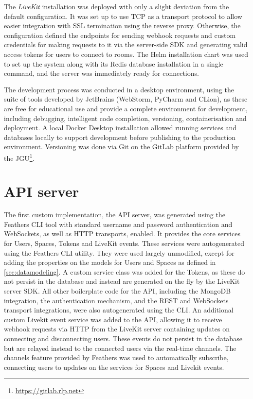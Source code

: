 The \emph{LiveKit} installation was deployed with only a slight deviation from the default configuration.
It was set up to use \ac{TCP} as a transport protocol to allow easier integration with \ac{SSL} termination using the reverse proxy.
Otherwise, the configuration defined the endpoints for sending webhook requests and custom credentials for making requests to it via the server-side \ac{SDK} and generating valid access tokens for users to connect to rooms.
The Helm installation chart was used to set up the system along with its Redis database installation in a single command, and the server was immediately ready for connections.

The development process was conducted in a desktop environment, using the suite of tools developed by JetBrains (WebStorm, PyCharm and CLion), as these are free for educational use and provide a complete environment for development, including debugging, intelligent code completion, versioning, containerisation and deployment.
A local Docker Desktop installation allowed running services and databases locally to support development before publishing to the production environment.
Versioning was done via Git on the GitLab platform provided by the \ac{JGU}\footnote{\url{https://gitlab.rlp.net}}.

\section{API server}
\label{sec:api-server}

The first custom implementation, the \ac{API} server, was generated using the Feathers \ac{CLI} tool with standard username and password authentication and WebSockets, as well as \ac{HTTP} transports, enabled.
It provides the core services for Users, Spaces, Tokens and LiveKit events.
These services were autogenerated using the Feathers \ac{CLI} utility.
They were used largely unmodified, except for adding the properties on the models for Users and Spaces as defined in \autoref{sec:datamodeling}.
A custom service class was added for the Tokens, as these do not persist in the database and instead are generated on the fly by the LiveKit server \ac{SDK}.
All other boilerplate code for the \ac{API}, including the MongoDB integration, the authentication mechanism, and the REST and WebSockets transport integrations, were also autogenerated using the \ac{CLI}.
An additional custom Livekit event service was added to the API, allowing it to receive webhook requests via \ac{HTTP} from the LiveKit server containing updates on connecting and disconnecting users.
These events do not persist in the database but are relayed instead to the connected users via the real-time channels.
The channels feature provided by Feathers was used to automatically subscribe, connecting users to updates on the services for Spaces and Livekit events.

